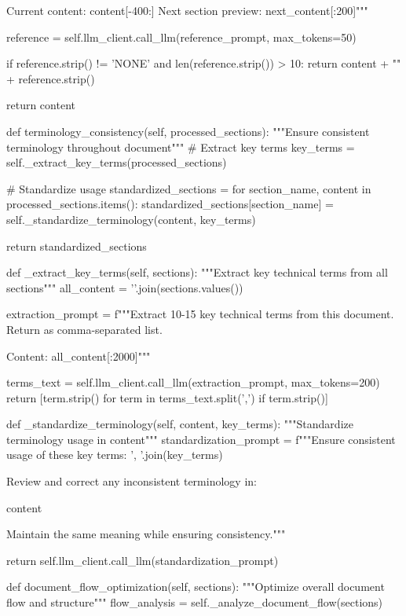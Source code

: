 Current content: {content[-400:]}
Next section preview: {next_content[:200]}"""
        
        reference = self.llm_client.call_llm(reference_prompt, max_tokens=50)
        
        if reference.strip() != 'NONE' and len(reference.strip()) > 10:
            return content + "\n\n" + reference.strip()
        
        return content
    
    def terminology_consistency(self, processed_sections):
        """Ensure consistent terminology throughout document"""
        # Extract key terms
        key_terms = self._extract_key_terms(processed_sections)
        
        # Standardize usage
        standardized_sections = {}
        for section_name, content in processed_sections.items():
            standardized_sections[section_name] = self._standardize_terminology(content, key_terms)
        
        return standardized_sections
    
    def _extract_key_terms(self, sections):
        """Extract key technical terms from all sections"""
        all_content = '\n'.join(sections.values())
        
        extraction_prompt = f"""Extract 10-15 key technical terms from this document. 
Return as comma-separated list.

Content: {all_content[:2000]}"""
        
        terms_text = self.llm_client.call_llm(extraction_prompt, max_tokens=200)
        return [term.strip() for term in terms_text.split(',') if term.strip()]
    
    def _standardize_terminology(self, content, key_terms):
        """Standardize terminology usage in content"""
        standardization_prompt = f"""Ensure consistent usage of these key terms: {', '.join(key_terms)}

Review and correct any inconsistent terminology in:

{content}

Maintain the same meaning while ensuring consistency."""
        
        return self.llm_client.call_llm(standardization_prompt)
    
    def document_flow_optimization(self, sections):
        """Optimize overall document flow and structure"""
        flow_analysis = self._analyze_document_flow(sections)
        
